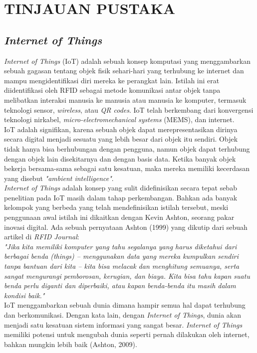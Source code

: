 \chapter{TINJAUAN PUSTAKA}
\section{\textit{Internet of Things}}
\tab \textit{Internet of Things} (IoT) adalah sebuah konsep komputasi yang menggambarkan sebuah gagasan tentang objek fisik sehari-hari yang terhubung ke internet dan mampu mengidentifikasi diri mereka ke perangkat lain. Istilah ini erat diidentifikasi oleh RFID sebagai metode komunikasi antar objek tanpa melibatkan interaksi manusia ke manusia atau manusia ke komputer, termasuk teknologi sensor, \textit{wireless}, atau \textit{QR codes}. IoT telah berkembang dari konvergensi teknologi nirkabel, \textit{micro-electromechanical systems} (MEMS), dan internet.\\
\tab IoT adalah signifikan, karena sebuah objek dapat merepresentasikan dirinya secara digital menjadi sesuatu yang lebih besar dari objek itu sendiri. Objek tidak hanya bisa berhubungan dengan pengguna, namun objek dapat terhubung dengan objek lain disekitarnya dan dengan basis data. Ketika banyak objek bekerja bersama-sama sebagai satu kesatuan, maka mereka memiliki kecerdasan yang disebut \textit{"ambient intelligence"}.\\
\tab \textit{Internet of Things} adalah konsep yang sulit didefinisikan secara tepat sebab penelitian pada IoT masih dalam tahap perkembangan. Bahkan ada banyak kelompok yang berbeda yang telah mendefinisikan istilah tersebut, meski penggunaan awal istilah ini dikaitkan dengan Kevin Ashton, seorang pakar inovasi digital. Ada sebuah pernyataan Ashton (1999) yang dikutip dari sebuah artikel di \textit{RFID Journal}:\\
\tab \textit{"Jika kita memiliki komputer yang tahu segalanya yang harus diketahui dari berbagai benda \textit{(things)} – menggunakan data yang mereka kumpulkan sendiri tanpa bantuan dari kita – kita bisa melacak dan menghitung semuanya, serta sangat mengurangi pemborosan, kerugian, dan biaya. Kita bisa tahu kapan suatu benda perlu diganti dan diperbaiki, atau kapan benda-benda itu masih dalam kondisi baik."}\\
\tab IoT menggambarkan sebuah dunia dimana hampir semua hal dapat terhubung dan berkomunikasi. Dengan kata lain, dengan \textit{Internet of Things}, dunia akan menjadi satu kesatuan sistem informasi yang sangat besar. \textit{Internet of Things} memiliki potensi untuk mengubah dunia seperti pernah dilakukan oleh internet, bahkan mungkin lebih baik (Ashton, 2009). 

